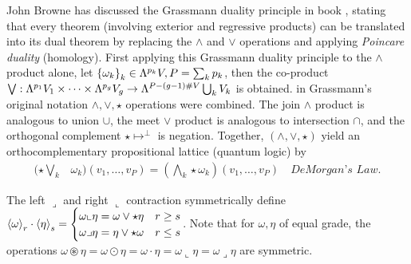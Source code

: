 \documentclass[]{article}
\begin{document}
John Browne has discussed the Grassmann duality principle in book \cite{browne}, stating that every theorem (involving exterior and regressive products) can be translated into its dual theorem by replacing the $\wedge$ and $\vee$ operations and applying \textit{Poincare duality} (homology).
First applying this Grassmann duality principle to the $\wedge$ product alone, let $\left\{ \omega_k \right\}_k\in\Lambda^{p_k}V, P=\sum_kp_k$, then the co-product
$\bigvee :\Lambda^{p_1}V_1\times\dots\times\Lambda^{p_g}V_g \rightarrow \Lambda^{P-(g-1)\#V}\bigcup_k V_k$ is obtained.
in Grassmann's original notation $\wedge,\vee,\star$ operations were combined.
The join $\wedge$ product is analogous to union $\cup$, the meet $\vee$ product is analogous to intersection $\cap$, and the orthogonal complement $\star\mapsto^\perp$ is negation.
Together, $(\wedge,\vee,\star)$ yield an orthocomplementary propositional lattice (quantum logic) by
\begin{align*}
	(\star\bigvee_k &\omega_k)(v_1,\dots,v_P) = (\bigwedge_k\star\omega_k)(v_1,\dots,v_P) \quad \textit{DeMorgan's Law}.
\end{align*}
\begin{definition}
	The left $\lrcorner$ and right $\llcorner$ contraction symmetrically define
	$ \left\langle \omega \right\rangle_r\cdot\left\langle \eta \right\rangle_s = \begin{cases} \omega\llcorner\eta=\omega\vee\star\eta & r\geq s \\ \omega\lrcorner\eta=\eta\vee\star\omega & r\leq s \end{cases} $.
	Note that for $\omega,\eta$ of equal grade, the operations $\omega\circledast\eta = \omega\odot\eta = \omega\cdot\eta = \omega\llcorner\eta = \omega\lrcorner\eta$ are symmetric.
\end{definition}
\end{document}
